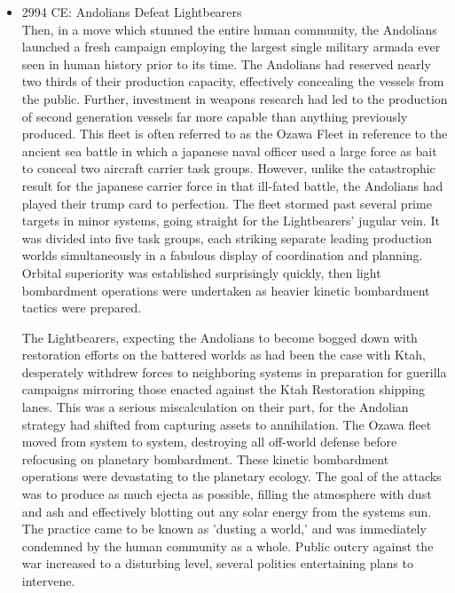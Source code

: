 \begin{itemize}
\item 2994 CE: Andolians Defeat Lightbearers \\

Then, in a move which stunned the entire human community, the
Andolians launched a fresh campaign employing the largest single
military armada ever seen in human history prior to its time.  The
Andolians had reserved nearly two thirds of their production capacity,
effectively concealing the vessels from the public.  Further,
investment in weapons research had led to the production of second
generation vessels far more capable than anything previously produced.
This fleet is often referred to as the Ozawa Fleet in reference to the
ancient sea battle in which a japanese naval officer used a large
force as bait to conceal two aircraft carrier task groups.  However,
unlike the catastrophic result for the japanese carrier force in that
ill-fated battle, the Andolians had played their trump card to
perfection.  The fleet stormed past several prime targets in minor
systems, going straight for the Lightbearers' jugular vein.  It was
divided into five task groups, each striking separate leading
production worlds simultaneously in a fabulous display of coordination
and planning.  Orbital superiority was established surprisingly
quickly, then light bombardment operations were undertaken as heavier
kinetic bombardment tactics were prepared.

The Lightbearers, expecting the Andolians to become bogged down with
restoration efforts on the battered worlds as had been the case with
Ktah, desperately withdrew forces to neighboring systems in
preparation for guerilla campaigns mirroring those enacted against the
Ktah Restoration shipping lanes.  This was a serious miscalculation on
their part, for the Andolian strategy had shifted from capturing
assets to annihilation.  The Ozawa fleet moved from system to system,
destroying all off-world defense before refocusing on planetary
bombardment.  These kinetic bombardment operations were devastating to
the planetary ecology.  The goal of the attacks was to produce as much
ejecta as possible, filling the atmosphere with dust and ash and
effectively blotting out any solar energy from the systems sun.  The
practice came to be known as 'dusting a world,' and was immediately
condemned by the human community as a whole.  Public outcry against
the war increased to a disturbing level, several polities entertaining
plans to intervene.


\end{itemize}
